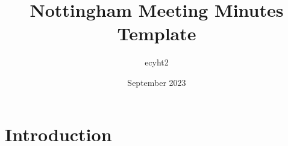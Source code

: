 \documentclass{article}
\title{Nottingham Meeting Minutes Template}
\author{ecyht2}
\date{September 2023}
\begin{document}
\maketitle

\section{Introduction}
\end{document}
